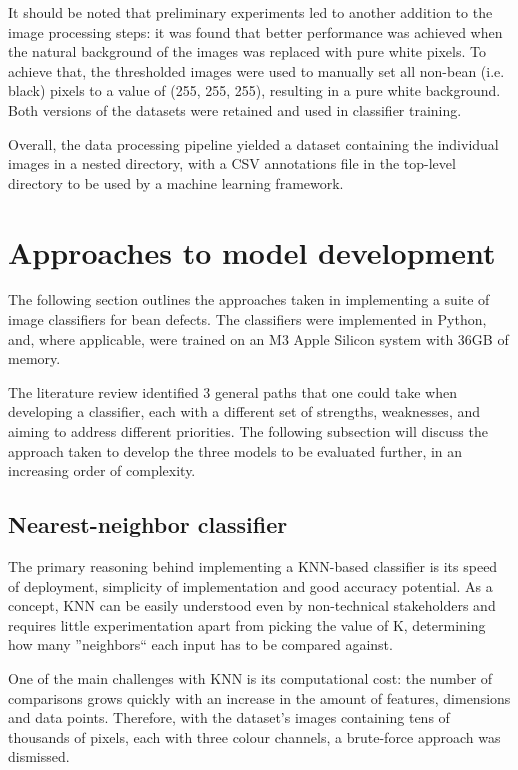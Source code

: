 It should be noted that preliminary experiments led to another addition to the image processing steps:
it was found that better performance was achieved when the natural background of the images was replaced with pure white pixels.
To achieve that, the thresholded images were used to manually set all non-bean (i.e. black) pixels to a value of (255, 255, 255),
resulting in a pure white background.
Both versions of the datasets were retained and used in classifier training.

Overall, the data processing pipeline yielded a dataset containing the individual images in a nested directory, with
a CSV annotations file in the top-level directory to be used by a machine learning framework.

\section{Approaches to model development}
\label{sec:approaches-to-model-development}
The following section outlines the approaches taken in implementing a suite of image classifiers for bean defects.
The classifiers were implemented in Python, and, where applicable, were trained on an M3 Apple Silicon system with 36GB
of memory.

The literature review identified 3 general paths that one could take when developing a classifier, each with a different
set of strengths, weaknesses, and aiming to address different priorities.
The following subsection will discuss the approach taken to develop the three models to be evaluated further, in an
increasing order of complexity.
\subsection{Nearest-neighbor classifier}
\label{subsec:knn-classifier}
The primary reasoning behind implementing a KNN-based classifier is its speed of deployment, simplicity of implementation
and good accuracy potential.
As a concept, KNN can be easily understood even by non-technical stakeholders and requires little experimentation apart
from picking the value of K, determining how many ''neighbors`` each input has to be compared against.

One of the main challenges with KNN is its computational cost: the number of comparisons grows quickly with an increase
in the amount of features, dimensions and data points.
Therefore, with the dataset's images containing tens of thousands of pixels, each with three colour channels, a brute-force
approach was dismissed.

